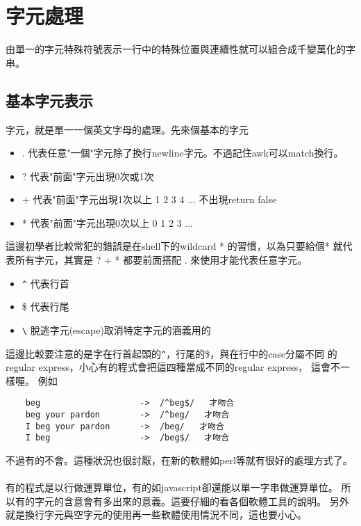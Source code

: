     \section{字元處理}
    由單一的字元特殊符號表示一行中的特殊位置與連續性就可以組合成千變萬化的字串。
    \subsection{基本字元表示}
    字元，就是單一一個英文字母的處理。先來個基本的字元
    \begin{itemize}
    \item .   代表任意"一個"字元除了換行newline字元。不過記住awk可以match換行。
    \item ?   代表"前面"字元出現0次或1次
    \item +   代表"前面"字元出現1次以上 1 2 3 4 ... 不出現return false 
    \item *   代表"前面"字元出現0次以上 0 1 2 3 ...
    \end{itemize}
    這邊初學者比較常犯的錯誤是在shell下的wildcard * 的習慣，以為只要給個*
    就代表所有字元，其實是 ? + * 都要前面搭配 . 來使用才能代表任意字元。
    \begin{itemize}
    \item \verb=^=   代表行首
    \item \$   代表行尾
    \item \verb=\=   脫逃字元(escape)取消特定字元的涵義用的
    \end{itemize}
    這邊比較要注意的是字在行首起頭的\verb=^=，行尾的\$，與在行中的case分屬不同
    的regular express，小心有的程式會把這四種當成不同的regular express，
    這會不一樣喔。
    例如
    \begin{verbatim}
    beg                    ->  /^beg$/   才吻合
    beg your pardon        ->  /^beg/   才吻合
    I beg your pardon      ->  /beg/   才吻合
    I beg                  ->  /beg$/   才吻合
    \end{verbatim}
    不過有的不會。這種狀況也很討厭，在新的軟體如perl等就有很好的處理方式了。
    \\\\
    有的程式是以行做運算單位，有的如javascript卻還能以單一字串做運算單位。
    所以有的字元的含意會有多出來的意義。這要仔細的看各個軟體工具的說明。
    另外就是換行字元與空字元的使用再一些軟體使用情況不同，這也要小心。
